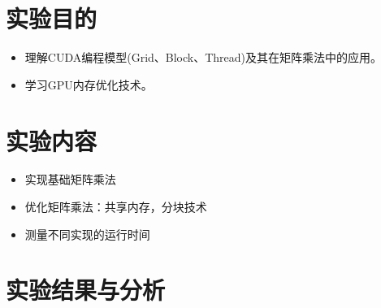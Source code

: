 \documentclass{SYSUReport}
\date{2025年5月28日}
\begin{document}
\cover
\thispagestyle{empty} %
\clearpage



\section{实验目的}
\begin{itemize}
    \item 理解CUDA编程模型(Grid、Block、Thread)及其在矩阵乘法中的应用。
    \item 学习GPU内存优化技术。
\end{itemize}
\section{实验内容}
\begin{itemize}
    \item 实现基础矩阵乘法
\item 优化矩阵乘法：共享内存，分块技术
\item 测量不同实现的运行时间
\end{itemize}
\section{实验结果与分析}
\end{document}
